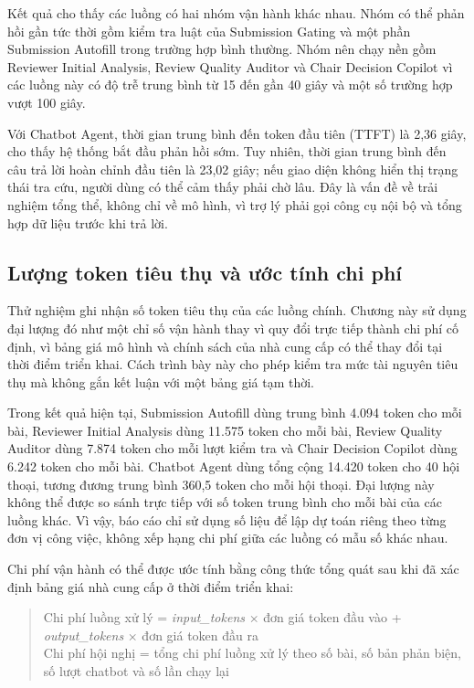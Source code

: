 Kết quả cho thấy các luồng có hai nhóm vận hành khác nhau. Nhóm có thể phản hồi gần tức thời gồm kiểm tra luật của Submission Gating và một phần Submission Autofill trong trường hợp bình thường. Nhóm nên chạy nền gồm Reviewer Initial Analysis, Review Quality Auditor và Chair Decision Copilot vì các luồng này có độ trễ trung bình từ 15 đến gần 40 giây và một số trường hợp vượt 100 giây.

Với Chatbot Agent, thời gian trung bình đến token đầu tiên (TTFT) là 2,36 giây, cho thấy hệ thống bắt đầu phản hồi sớm. Tuy nhiên, thời gian trung bình đến câu trả lời hoàn chỉnh đầu tiên là 23,02 giây; nếu giao diện không hiển thị trạng thái tra cứu, người dùng có thể cảm thấy phải chờ lâu. Đây là vấn đề về trải nghiệm tổng thể, không chỉ về mô hình, vì trợ lý phải gọi công cụ nội bộ và tổng hợp dữ liệu trước khi trả lời.

\subsection{Lượng token tiêu thụ và ước tính chi phí}

Thử nghiệm ghi nhận số token tiêu thụ của các luồng chính. Chương này sử dụng đại lượng đó như một chỉ số vận hành thay vì quy đổi trực tiếp thành chi phí cố định, vì bảng giá mô hình và chính sách của nhà cung cấp có thể thay đổi tại thời điểm triển khai. Cách trình bày này cho phép kiểm tra mức tài nguyên tiêu thụ mà không gắn kết luận với một bảng giá tạm thời.

Trong kết quả hiện tại, Submission Autofill dùng trung bình 4.094 token cho mỗi bài, Reviewer Initial Analysis dùng 11.575 token cho mỗi bài, Review Quality Auditor dùng 7.874 token cho mỗi lượt kiểm tra và Chair Decision Copilot dùng 6.242 token cho mỗi bài. Chatbot Agent dùng tổng cộng 14.420 token cho 40 hội thoại, tương đương trung bình 360,5 token cho mỗi hội thoại. Đại lượng này không thể được so sánh trực tiếp với số token trung bình cho mỗi bài của các luồng khác. Vì vậy, báo cáo chỉ sử dụng số liệu để lập dự toán riêng theo từng đơn vị công việc, không xếp hạng chi phí giữa các luồng có mẫu số khác nhau.

Chi phí vận hành có thể được ước tính bằng công thức tổng quát sau khi đã xác định bảng giá nhà cung cấp ở thời điểm triển khai:

\begin{quote}
Chi phí luồng xử lý = \textit{input\_tokens} $\times$ đơn giá token đầu vào + \textit{output\_tokens} $\times$ đơn giá token đầu ra\\
Chi phí hội nghị = tổng chi phí luồng xử lý theo số bài, số bản phản biện, số lượt chatbot và số lần chạy lại\\
\end{quote}

